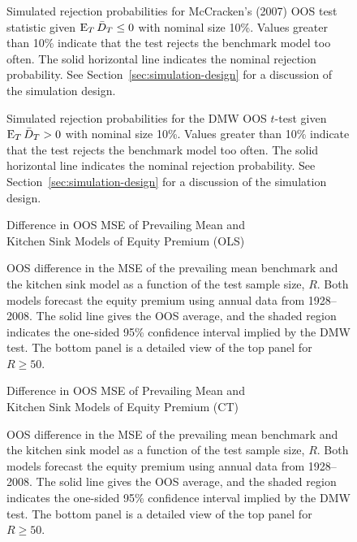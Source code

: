 \documentclass[11pt]{article}
\begin{document}
\begin{figure}
  
  \caption{Simulated rejection probabilities for McCracken's (2007)
    OOS test statistic given $\operatorname{E}_T \bar{D}_{T} \leq 0$ with
    nominal size 10\%.  Values greater than 10\% indicate that the
    test rejects the benchmark model too often.  The solid horizontal
    line indicates the nominal rejection probability.  See
    Section~\ref{sec:simulation-design} for a discussion of the
    simulation design.}
  \label{fig:mccracken}
\end{figure}

\begin{figure}
  \caption{Simulated rejection probabilities for the DMW
    OOS $t$-test given $\operatorname{E}_T \bar{D}_{T} > 0$ with nominal
    size 10\%.  Values greater than 10\% indicate that the test
    rejects the benchmark model too often.  The solid horizontal line
    indicates the nominal rejection probability.  See
    Section~\ref{sec:simulation-design} for a discussion of the
    simulation design.}
  \label{fig:ttest-power}
\end{figure}

\begin{figure}
\centering
\large{Difference in OOS MSE of Prevailing Mean and\\ Kitchen
    Sink Models of Equity Premium (OLS)}


\caption{OOS difference in the MSE
  of the prevailing mean benchmark and the kitchen sink model as a
  function of the test sample size, $R$.  Both models forecast the
  equity premium using annual data from 1928--2008.  The solid line
  gives the OOS average, and the shaded region indicates the
  one-sided 95\% confidence interval implied by the
  DMW test.  The bottom panel is a detailed view of the top
  panel for $R \geq 50$.}
\label{fig:empirics1}
\end{figure}

\begin{figure}
\centering
\large{Difference in OOS MSE of Prevailing Mean and\\ Kitchen
    Sink Models of Equity Premium (CT)}


\caption{OOS difference in the MSE
  of the prevailing mean benchmark and the kitchen sink model as a
  function of the test sample size, $R$.  Both models forecast the
  equity premium using annual data from 1928--2008.  The solid line
  gives the OOS average, and the shaded region indicates the
  one-sided 95\% confidence interval implied by the 
  DMW test.  The bottom panel is a detailed view of the top
  panel for $R \geq 50$.}
\label{fig:empirics2}
\end{figure}
\end{document}
